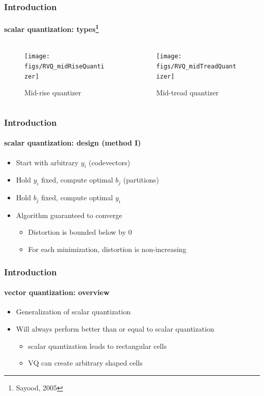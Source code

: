 \begin{frame}
\frametitle{Introduction}
\framesubtitle{scalar quantization: types\footnote{Sayood, 2005}}
\logoCSIPCPL\mypagenum
	\begin{columns}
		\begin{column}{1.5in}
			\begin{figure}
			{
				\texttt{[image: figs/RVQ\_midRiseQuantizer]}
				\caption {Mid-rise quantizer}
			}
			\end{figure}
		\end{column}
		\begin{column}{1.5in}
			\begin{figure}
			{
				\texttt{[image: figs/RVQ\_midTreadQuantizer]}
				\caption {Mid-tread quantizer}
			}
			\end{figure}
		\end{column}
	\end{columns}
\end{frame}





\begin{frame}
\frametitle{Introduction}
\framesubtitle{scalar quantization: design (method I)}
\logoCSIPCPL\mypagenum
	\begin{itemize}
		\item Start with arbitrary $y_i$ (codevectors)
		\item Hold $y_i$ fixed, compute optimal $b_j$ (partitions)
		\item Hold $b_j$ fixed, compute optimal $y_i$
		\item Algorithm guaranteed to converge
			\begin{itemize}
				\item Distortion is bounded below by 0
				\item For each minimization, distortion is non-increasing
			\end{itemize}
	\end{itemize}
\end{frame}

\begin{frame}
\frametitle{Introduction}
\framesubtitle{vector quantization: overview}
\logoCSIPCPL\mypagenum
	\begin{itemize}
		\item Generalization of scalar quantization
		\item Will always perform better than or equal to scalar quantization
			\begin{itemize}
				\item scalar quantization leads to rectangular cells
				\item VQ can create arbitrary shaped cells
			\end{itemize}		
	\end{itemize}
\end{frame}


